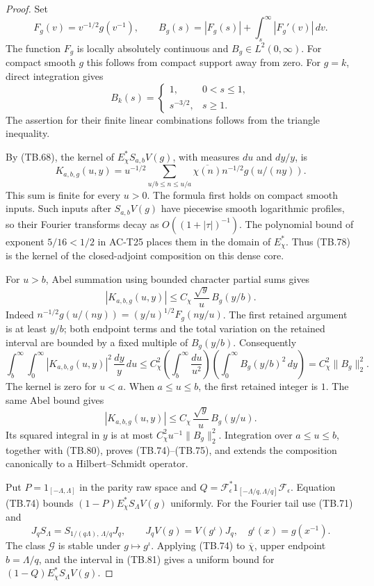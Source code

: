 \begin{proof}
Set
\[
 F_g(v)=v^{-1/2}g(v^{-1}),\qquad
 B_g(s)=|F_g(s)|+\int_s^\infty|F_g'(v)|\,dv.
 \tag{TB.77}
\]
The function \(F_g\) is locally absolutely continuous and
\(B_g\in L^2(0,\infty)\).
For compact smooth \(g\) this follows from compact support
away from zero.
For \(g=k\), direct integration gives
\[
                B_k(s)=
                 \begin{cases}1,&0<s\leq1,\\
                               s^{-3/2},&s\geq1.
                  \end{cases}
\]
The assertion for their finite linear combinations follows
from the triangle inequality.

By (TB.68), the kernel of \(E_\chi^*S_{a,b}V(g)\),
with measures \(du\) and \(dy/y\), is
\[
 K_{a,b,g}(u,y)
   =u^{-1/2}\!
       \sum_{u/b\leq n\leq u/a}
          \overline{\chi(n)}n^{-1/2}g(u/(ny)).
 \tag{TB.78}
\]
This sum is finite for every \(u>0\).
The formula first holds on compact smooth inputs.
Such inputs after \(S_{a,b}V(g)\) have piecewise smooth
logarithmic profiles, so their Fourier transforms decay
as \(O((1+|\tau|)^{-1})\).
The polynomial bound of exponent \(5/16<1/2\) in AC-T25
places them in the domain of \(E_\chi^*\).
Thus (TB.78) is the kernel of the closed-adjoint composition
on this dense core.

For \(u>b\), Abel summation using bounded character partial
sums gives
\[
 |K_{a,b,g}(u,y)|
    \leq C_\chi\,\frac{\sqrt y}{u}\,B_g(y/b).
 \tag{TB.79}
\]
Indeed
\(n^{-1/2}g(u/(ny))=(y/u)^{1/2}F_g(ny/u)\).
The first retained argument is at least \(y/b\);
both endpoint terms and the total variation on the
retained interval are bounded by a fixed multiple of
\(B_g(y/b)\).
Consequently
\[
 \int_b^\infty\!\!\int_0^\infty
       |K_{a,b,g}(u,y)|^2\,\frac{dy}{y}\,du
 \leq C_\chi^2
       \left(\int_b^\infty\frac{du}{u^2}\right)
       \left(\int_0^\infty B_g(y/b)^2\,dy\right)
 =C_\chi^2\|B_g\|_2^2.
 \tag{TB.80}
\]
The kernel is zero for \(u<a\).
When \(a\leq u\leq b\), the first retained integer is \(1\).
The same Abel bound gives
\[
 |K_{a,b,g}(u,y)|
       \leq C_\chi\,\frac{\sqrt y}{u}\,B_g(y/u).
 \]
Its squared integral in \(y\) is at most
\(C_\chi^2u^{-1}\|B_g\|_2^2\).
Integration over \(a\leq u\leq b\), together with
(TB.80), proves (TB.74)--(TB.75), and extends the
composition canonically to a Hilbert--Schmidt operator.

Put \(P=1_{[-\Lambda,\Lambda]}\) in the parity raw space
and \(Q=\mathcal F_\epsilon^*1_{[-\Lambda/q,\Lambda/q]}
                                      \mathcal F_\epsilon\).
Equation (TB.74) bounds
\((1-P)E_\chi^*S_\Lambda V(g)\) uniformly.
For the Fourier tail use (TB.71) and
\[
 J_qS_\Lambda=S_{1/(q\Lambda),\,\Lambda/q}J_q,\qquad
 J_qV(g)=V(g^\iota)J_q,\quad g^\iota(x)=g(x^{-1}).
 \tag{TB.81}
\]
The class \(\mathscr G\) is stable under \(g\mapsto g^\iota\).
Applying (TB.74) to \(\overline\chi\), upper endpoint
\(b=\Lambda/q\), and the interval in (TB.81) gives a
uniform bound for
\((1-Q)E_\chi^*S_\Lambda V(g)\).


\end{proof}
